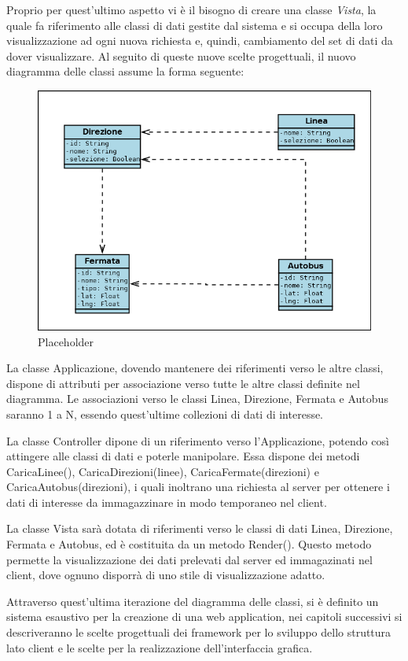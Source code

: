 Proprio per quest'ultimo aspetto vi è il bisogno di creare una classe {\itshape Vista}, la quale fa riferimento alle classi di dati gestite dal sistema e si occupa della loro visualizzazione ad ogni nuova richiesta e, quindi, cambiamento del set di dati da dover visualizzare.
\newpage
Al seguito di queste nuove scelte progettuali, il nuovo diagramma delle classi assume la forma seguente:

\begin{figure}[htbp]
\begin{center}
\includegraphics[width=14cm]{contents/images/dcd1}
\end{center}
\caption{Placeholder}
\label{fig:placeholder}
\end{figure}

La classe Applicazione, dovendo mantenere dei riferimenti verso le altre classi, dispone di attributi per associazione verso tutte le altre classi definite nel diagramma. Le associazioni verso le classi Linea, Direzione, Fermata e Autobus saranno 1 a N, essendo quest'ultime collezioni di dati di interesse.

La classe Controller dipone di un riferimento verso l'Applicazione, potendo così attingere alle classi di dati e poterle manipolare. Essa dispone dei metodi CaricaLinee(), CaricaDirezioni(linee), CaricaFermate(direzioni) e CaricaAutobus(direzioni), i quali inoltrano una richiesta al server per ottenere i dati di interesse da immagazzinare in modo temporaneo nel client.

La classe Vista sarà dotata di riferimenti verso le classi di dati Linea, Direzione, Fermata e Autobus, ed è costituita da un metodo Render(). Questo metodo permette la visualizzazione dei dati prelevati dal server ed immagazinati nel client, dove ognuno disporrà di uno stile di visualizzazione adatto.


Attraverso quest'ultima iterazione del diagramma delle classi, si è definito un sistema esaustivo per la creazione di una web application, nei capitoli successivi si descriveranno le scelte progettuali dei framework per lo sviluppo dello struttura lato client e le scelte per la realizzazione dell'interfaccia grafica.

\newpage
